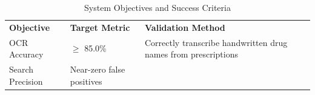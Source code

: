 \documentclass[12pt,a4paper,oneside]{report}
\begin{document}
\begin{longtable}[]{@{}
  >{\raggedright\arraybackslash}p{}
  >{\raggedright\arraybackslash}p{}
  >{\raggedright\arraybackslash}p{}@{}}
\caption{System Objectives and Success Criteria\label{tab:table1}}\\

\toprule\noalign{}
\begin{minipage}[b]{\linewidth}\raggedright

\textbf{Objective}

\end{minipage} & \begin{minipage}[b]{\linewidth}\raggedright

\textbf{Target Metric}

\end{minipage} & \begin{minipage}[b]{\linewidth}\raggedright

\textbf{Validation Method}

\end{minipage} \\
\begin{minipage}[b]{\linewidth}\raggedright

OCR Accuracy

\end{minipage} & \begin{minipage}[b]{\linewidth}\raggedright

\emph{$\ge$} 85.0\%

\end{minipage} & \begin{minipage}[b]{\linewidth}\raggedright

Correctly transcribe handwritten drug names from prescriptions

\end{minipage} \\
\begin{minipage}[b]{\linewidth}\raggedright

Search Precision

\end{minipage} & \begin{minipage}[b]{\linewidth}\raggedright

Near-zero false positives

\end{minipage} & \begin{minipage}[b]{\linewidth}\raggedright


\end{minipage}
\end{longtable}
\end{document}
